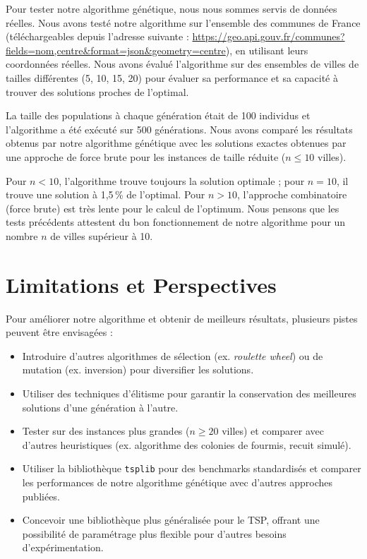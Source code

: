 \documentclass[a4paper,12pt]{article}
\begin{document}
Pour tester notre algorithme génétique, nous nous sommes servis de données réelles. Nous avons testé notre algorithme sur l'ensemble des communes de France (téléchargeables depuis l'adresse suivante : \url{https://geo.api.gouv.fr/communes?fields=nom,centre&format=json&geometry=centre}), en utilisant leurs coordonnées réelles. Nous avons évalué l'algorithme sur des ensembles de villes de tailles différentes (5, 10, 15, 20) pour évaluer sa performance et sa capacité à trouver des solutions proches de l'optimal.

La taille des populations à chaque génération était de 100 individus et l'algorithme a été exécuté sur 500 générations. Nous avons comparé les résultats obtenus par notre algorithme génétique avec les solutions exactes obtenues par une approche de force brute pour les instances de taille réduite ($n \leq 10$ villes).

Pour $n < 10$, l'algorithme trouve toujours la solution optimale ; pour $n = 10$, il trouve une solution à 1,5\,\% de l'optimal. Pour $n > 10$, l'approche combinatoire (force brute) est très lente pour le calcul de l'optimum. Nous pensons que les tests précédents attestent du bon fonctionnement de notre algorithme pour un nombre $n$ de villes supérieur à 10.

\section{Limitations et Perspectives}
Pour améliorer notre algorithme et obtenir de meilleurs résultats, plusieurs pistes peuvent être envisagées :
\begin{itemize}
    \item Introduire d'autres algorithmes de sélection (ex. \emph{roulette wheel}) ou de mutation (ex. inversion) pour diversifier les solutions.
    \item Utiliser des techniques d'élitisme pour garantir la conservation des meilleures solutions d'une génération à l'autre.
    \item Tester sur des instances plus grandes ($n \geq 20$ villes) et comparer avec d'autres heuristiques (ex. algorithme des colonies de fourmis, recuit simulé).
    \item Utiliser la bibliothèque \texttt{tsplib} \cite{tsblib} pour des benchmarks standardisés et comparer les performances de notre algorithme génétique avec d'autres approches publiées.
    \item Concevoir une bibliothèque plus généralisée pour le TSP, offrant une possibilité de paramétrage plus flexible pour d'autres besoins d'expérimentation.
\end{itemize}
\end{document}
